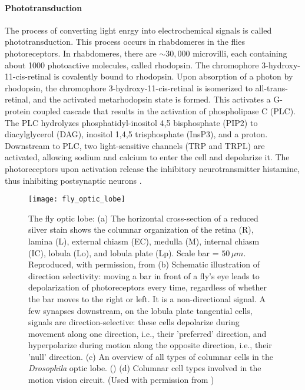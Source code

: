 \paragraph{Phototransduction}
The process of converting light enrgy into electrochemical signals is called phototransduction. This process occurs in rhabdomeres in the flies photoreceptors. In rhabdomeres, there are ${\sim}30,000$ microvilli, each containing about 1000 photoactive molecules, called rhodopsin. The chromophore 3-hydroxy-11-cis-retinal is covalently bound to rhodopsin. Upon absorption of a photon by rhodopsin, the chromophore 3-hydroxy-11-cis-retinal is isomerized to all-trans-retinal, and the activated metarhodopsin state is formed. This activates a G-protein coupled cascade that results in the activation of phospholipase C (PLC). The PLC hydrolyzes phosphatidyl-inositol 4,5 bisphosphate (PIP2) to diacylglycerol (DAG), inositol 1,4,5 trisphosphate (InsP3), and a proton.  Downstream to PLC, two light-sensitive channels (TRP and TRPL) are activated, allowing sodium and calcium to enter the cell and depolarize it. The photoreceptors upon activation release the inhibitory neurotransmitter histamine, thus inhibiting postsynaptic neurons \parencite{Hardie2001, Hardie1989, Hardie2015}.

\begin{figure}
\centering
\hspace*{-1cm} 
\texttt{[image: fly\_optic\_lobe]}
\caption[The fly optic lobe] {The fly optic lobe: (a) The horizontal cross-section of a reduced silver stain shows the columnar organization of the retina (R), lamina (L), external chiasm (EC), medulla (M), internal chiasm (IC), lobula (Lo), and lobula plate (Lp). Scale bar = $50 \, \mu m$. Reproduced, with permission, from \cite{Takemura2008} (b) Schematic illustration of direction selectivity: moving a bar in front of a fly's eye leads to depolarization of photoreceptors every time, regardless of whether the bar moves to the right or left. It is a non-directional signal. A few synapses downstream, on the lobula plate tangential cells, signals are direction-selective: these cells depolarize during movement along one direction, i.e., their 'preferred' direction, and hyperpolarize during motion along the opposite direction, i.e., their 'null' direction. (c) An overview of all types of columnar cells in the \textit{Drosophila} optic lobe. (\cite{Fischbach1989}) (d) Columnar cell types involved in the motion vision circuit. (Used with permission from \cite{Borst2020, Borst2020b})}
\label{fig:opticlobe}
\end{figure}

